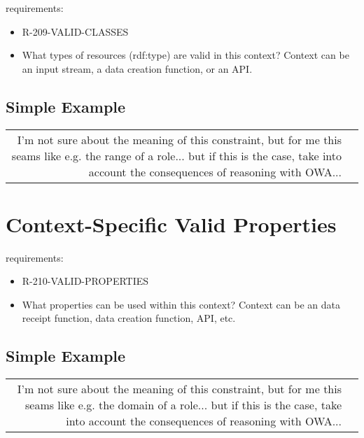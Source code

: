 \documentclass{llncs}
\newenvironment{DL}{
	\begin{center}
  \begin{tabular}{r l}

}{
  \end{tabular}
	\end{center}
}
\newcommand{\an}[1]{\todo[size=\small, color=green!40]{\textbf{Andy:} #1}}
\begin{document}
requirements:

\begin{itemize}
	\item R-209-VALID-CLASSES
\end{itemize}



\begin{itemize}
	\item What types of resources (rdf:type) are valid in this context? Context can be an input stream, a data creation function, or an API.
\end{itemize}

\subsection{Simple Example}

\begin{DL}
I'm not sure about the meaning of this constraint, but for me this seams like e.g. the range of a role... but if this is the case, take into account the consequences of reasoning with OWA...
\end{DL}

\an{not sure!}

\section{Context-Specific Valid Properties}

requirements:

\begin{itemize}
	\item R-210-VALID-PROPERTIES
\end{itemize}

\begin{itemize}
	\item What properties can be used within this context? Context can be an data receipt function, data creation function, API, etc.
\end{itemize}

\subsection{Simple Example}

\begin{DL}
I'm not sure about the meaning of this constraint, but for me this seams like e.g. the domain of a role... but if this is the case, take into account the consequences of reasoning with OWA...
\end{DL}
\end{document}
